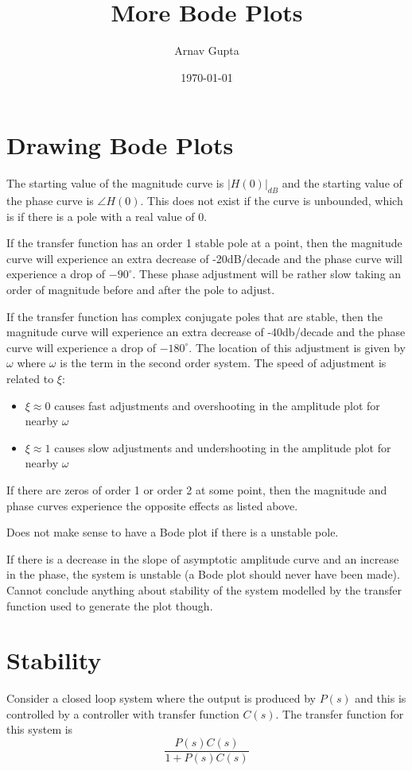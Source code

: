 \documentclass[11pt]{article}
\author{Arnav Gupta}
\date{\today}
\title{More Bode Plots}
\begin{document}
\maketitle
\tableofcontents

\section{Drawing Bode Plots}
\label{sec:orgaf2ee05}
The starting value of the magnitude curve is \(|H(0)|_{dB}\) and the starting value of the phase curve
is \(\angle H(0)\).
This does not exist if the curve is unbounded, which is if there is a pole with a real value of 0.

If the transfer function has an order 1 stable pole at a point, then the magnitude curve will
experience an extra decrease of -20dB/decade and the phase curve will experience a drop of \(-90^{\circ}\).
These phase adjustment will be rather slow taking an order of magnitude before and after the pole
to adjust.

If the transfer function has complex conjugate poles that are stable, then the magnitude curve
will experience an extra decrease of -40db/decade and the phase curve will experience a drop of
\(-180^{\circ}\).
The location of this adjustment is given by \(\omega\) where \(\omega\) is the term in the second order
system.
The speed of adjustment is related to \(\xi\):
\begin{itemize}
\item \(\xi \approx 0\) causes fast adjustments and overshooting in the amplitude plot for nearby \(\omega\)
\item \(\xi \approx 1\) causes slow adjustments and undershooting in the amplitude plot for nearby \(\omega\)
\end{itemize}

If there are zeros of order 1 or order 2 at some point, then the magnitude and phase curves
experience the opposite effects as listed above.

Does not make sense to have a Bode plot if there is a unstable pole.

If there is a decrease in the slope of asymptotic amplitude curve and an increase in the phase,
the system is unstable (a Bode plot should never have been made).
Cannot conclude anything about stability of the system modelled by the transfer function used to
generate the plot though.
\section{Stability}
\label{sec:org5a83f43}
Consider a closed loop system  where the output is produced by \(P(s)\) and this is controlled by a
controller with transfer function \(C(s)\).
The transfer function for this system is
$$
\frac{P(s)C(s)}{1 + P(s)C(s)}
$$
\end{document}
